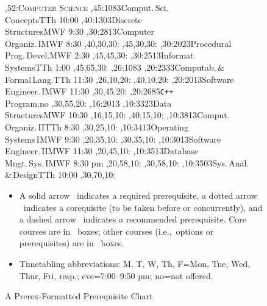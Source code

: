 \begin{figure}
\small
\setcounter{diagheight}{50}
\textwidth6.25in
\begin{chart}\sf
{},52:{\textsf{\textsc{\Large Computer Science}}}
,45:{1083}{Comput.\,Sci.\\Concepts}{TTh 10:00}
,40:{1303}{Discrete\\Structures}{MWF 9:30}
,30:{2813}{Computer\\Organiz.\,I}{MWF 8:30}
  ,40,30,30:
  ,45,30,30:
,30:{2023}{Procedural\\Prog.\,Devel.}{MWF 2:30}
  ,45,45,30:
,30:{2513}{Informat.\\Systems}{TTh 1:00}
  ,45,65,30:
,26:{1083}
,20:{2333}{Computab.\,\&\\Formal\,Lang.}{TTh 11:30}
  ,26,10,20:
  ,40,10,20:
,20:{2013}{Software\\Engineer.\,I}{MWF 11:30}
  ,30,45,20:
,20:{2685}{\texttt{C++}\\Program.}{no}
  ,30,55,20:
,16:{2013}
,10:{3323}{Data\\Structures}{MWF 10:30}
  ,16,15,10:
  ,40,15,10:
,10:{3813}{Comput.\\Organiz.\,II}{TTh 8:30}
  ,30,25,10:
,10:{3413}{Operating\\Systems\,I}{MWF 9:30}
  ,20,35,10:
  ,30,35,10:
,10:{3013}{Software\\Engineer.\,II}{MWF 11:30}
  ,20,45,10:
,10:{3513}{Database\\Mngt.\,Sys.\,I}{MWF 8:30 pm}
  ,20,58,10:
  ,30,58,10:
,10:{3503}{Sys.\,Anal.\\\&\,Design}{TTh 10:00}
  ,30,70,10:
\end{chart}
\begin{center}
\begin{minipage}{6.0in}
\begin{itemize}\sf
\item
A solid arrow \solidarrow\  indicates a required prerequisite, 
a dotted arrow \dottedarrow\ 
indicates a corequisite (to be taken before or concurrently), and a
dashed arrow \dashedarrow\ indicates a recommended prerequisite.
Core courses are in \boldbox\ boxes; 
other courses (i.e.,~options or prerequisites)
are in \lightbox\ boxes.
\item Timetabling abbreviations: M, T, W, Th, F=Mon, Tue, Wed, Thur, Fri, resp.; eve=7:00--9:50 pm; no=not offered.
\end{itemize}
\end{minipage}
\end{center}
\renewcommand{\bfdefault}{b}
\renewcommand{\mddefault}{m}
\caption{A Prerex-Formatted Prerequisite Chart}
\label{chart}
\end{figure}
